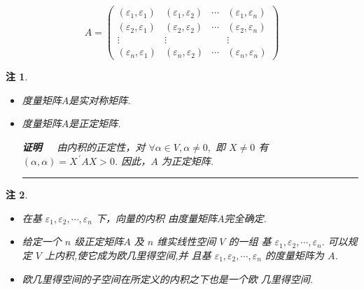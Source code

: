 \documentclass[13pt]{beamer}
\newtheorem*{rem}{注}
\def\qed{\nopagebreak\hfill{\rule{4pt}{7pt}}\medbreak}
\def\pf{{\bf 证明~~ }}
\begin{document}
\begin{frame}{}

$$A=
\left(\begin{array}{cccc}
\left(\varepsilon_{1}, \varepsilon_{1}\right) & \left(\varepsilon_{1}, \varepsilon_{2}\right) & \cdots & \left(\varepsilon_{1}, \varepsilon_{n}\right) \\ 
\left(\varepsilon_{2}, \varepsilon_{1}\right) & \left(\varepsilon_{2}, \varepsilon_{2}\right) & \cdots & \left(\varepsilon_{2}, \varepsilon_{n}\right) \\
\vdots & \vdots &  & \vdots \\ 
 \left(\varepsilon_{n}, \varepsilon_{1}\right)  & \left(\varepsilon_{n}, \varepsilon_{2}\right) & \cdots & \left(\varepsilon_{n}, \varepsilon_{n}\right)
\end{array}\right)$$

\begin{rem}
	\begin{itemize}
		\item 度量矩阵$A$是实对称矩阵.
		\item 度量矩阵$A$是正定矩阵.
		
		\pf 由内积的正定性，对 $\forall \alpha \in V, \alpha \neq {0},$ 即 $X \neq 0$
		有 $(\alpha, \alpha)=X^{\, \prime} A X>0$.
		因此，$ A$ 为正定矩阵. \qed

	\end{itemize}
\end{rem}
\end{frame}

\begin{frame}
\begin{rem}
\begin{itemize}
\item 在基 $\varepsilon_{1}, \varepsilon_{2}, \cdots, \varepsilon_{n}$ 下，向量的内积
	由度量矩阵$A$完全确定.
\item 给定一个 $n$ 级正定矩阵$A$ 及 $n$ 维实线性空间 $V$ 的一组 基 ${\varepsilon}_{1}, {\varepsilon}_{2}, \cdots, {\varepsilon}_{n} .$ 可以规定 $V$ 上内积,使它成为欧几里得空间,并
且基 ${\varepsilon}_{1}, {\varepsilon}_{2}, \cdots, {\varepsilon}_{n}$ 的度量矩阵为 ${A}$.
\item 欧几里得空间的子空间在所定义的内积之下也是一个欧
几里得空间.
\end{itemize}
\end{rem}
\end{frame}
\end{document}

